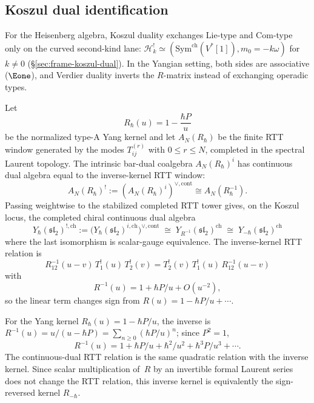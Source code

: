 \subsection{Koszul dual identification}

For the Heisenberg algebra, Koszul duality exchanges Lie-type and
Com-type only on the curved second-kind lane:
$\mathcal{H}_k^!\simeq
(\mathrm{Sym}^{\mathrm{ch}}(V^*[1]),m_0=-k\omega)$ for \(k\ne0\)
(\S\ref{sec:frame-koszul-dual}). In the Yangian setting, both sides
are associative ($\Eone$), and Verdier duality inverts the
$R$-matrix instead of exchanging operadic types.

\begin{theorem}\label{thm:yangian-koszul-dual}
Let
\[
R_\hbar(u)=1-\frac{\hbar P}{u}
\]
be the normalized type-A Yang kernel and let $A_N(R_\hbar)$ be the
finite RTT window generated by the modes $T_{ij}^{(r)}$ with
$0\le r\le N$, completed in the spectral Laurent topology.  The
intrinsic bar-dual coalgebra $A_N(R_\hbar)^i$ has continuous dual
algebra equal to the inverse-kernel RTT window:
\[
A_N(R_\hbar)^! := (A_N(R_\hbar)^i)^{\vee,\mathrm{cont}}
\cong A_N(R_\hbar^{-1}).
\]
Passing weightwise to the stabilized completed RTT tower gives, on
the Koszul locus, the completed chiral continuous dual algebra
\begin{equation}\label{eq:yangian-koszul-dual}
Y_\hbar(\mathfrak{sl}_2)^{!,\mathrm{ch}}
:=\bigl(Y_\hbar(\mathfrak{sl}_2)^{i,\mathrm{ch}}\bigr)^{\vee,\mathrm{cont}}
\;\cong\;
Y_{R^{-1}}(\mathfrak{sl}_2)^{\mathrm{ch}}
\;\cong\;
Y_{-\hbar}(\mathfrak{sl}_2)^{\mathrm{ch}}
\end{equation}
where the last isomorphism is scalar-gauge equivalence.  The
inverse-kernel RTT relation is
\[
R^{-1}_{12}(u-v)\, T_1^!(u)\, T_2^!(v) = T_2^!(v)\, T_1^!(u)\, R^{-1}_{12}(u-v)
\]
with
\[
R^{-1}(u) = 1 + \hbar P/u + O(u^{-2}),
\]
so the linear term changes sign from $R(u) = 1 - \hbar P/u + \cdots$.

For the Yang kernel $R_\hbar(u)=1-\hbar P/u$, the inverse is
$R^{-1}(u) = u/(u - \hbar P) = \sum_{n \geq 0} (\hbar P/u)^n$;
since $P^2 = 1$,
\[
R^{-1}(u) = 1 + \hbar P/u + \hbar^2/u^2 + \hbar^3 P/u^3 + \cdots.
\]
The continuous-dual RTT relation is the same quadratic relation with the
inverse kernel. Since scalar multiplication of~$R$ by an invertible
formal Laurent series does not change the RTT relation, this inverse
kernel is equivalently the sign-reversed kernel $R_{-\hbar}$.
\end{theorem}

